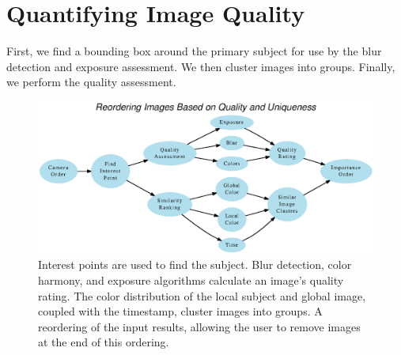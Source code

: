 \documentclass{article}
\begin{document}


\section{Quantifying Image Quality}

First, we find a bounding box around the primary subject for use by the blur detection and exposure assessment. We then cluster images into groups. Finally, we perform the quality assessment.
\begin{figure}
  \centering
    \includegraphics[scale=1.0,clip]{flowchart.eps}
  \caption{Interest points are used to find the subject. Blur detection, color harmony, and exposure algorithms calculate an image's quality rating. The color distribution of the local subject and global image, coupled with the timestamp, cluster images into groups. A reordering of the input results, allowing the user to remove images at the end of this ordering.}
\end{figure}
\end{document}
